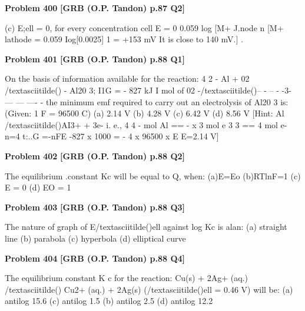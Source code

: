 \begin{problembox}
\textbf{Problem 400} \hfill \textbf{[GRB (O.P. Tandon) p.87 Q2]}
\label{q:ext-grb_all_questions-400}

(c) E;ell = 0, for every concentration cell 
E = 0 0.059 log [M+ J.node 
n 
[M+ lathode 
= \underline{\hspace{1cm}} 0.059 Iog[0.0025] 
1 
= +153 mV 
It is close to 140 mV.] .
\end{problembox}

\begin{problembox}
\textbf{Problem 401} \hfill \textbf{[GRB (O.P. Tandon) p.88 Q1]}
\label{q:ext-grb_all_questions-401}

On the basis of information available for the reaction: 
4 
2 
- Al + 02 /textasciitilde() 
- Al20 3; I1G = - 827 kJ I mol of 02 
-/textasciitilde()-- - --
- -3- ---
--- ---- -
the minimum emf required to carry out an electrolysis of 
Al20 3 is: 
(Given: 1 F = 96500 C) 
(a) 2.14 V 
(b) 4.28 V 
(c) 6.42 V 
(d) 8.56 V 
[Hint: 
Al /textasciitilde()AI3+ + 3e-
i. e., 
4 
4 
\underline{\hspace{1cm}} 
- mol Al == - x 3 mol e 
3 
3 
== 4 mol e-
n=4 
t:..G =-nFE 
-827 x 1000 = - 4 x 96500 x E 
E=2.14 V]
\end{problembox}

\begin{problembox}
\textbf{Problem 402} \hfill \textbf{[GRB (O.P. Tandon) p.88 Q2]}
\label{q:ext-grb_all_questions-402}

The equilibrium .constant Kc will be equal to Q, when: 
(a)E=Eo 
(b)RTlnF=1 
(c) E = 0 
(d) EO = 1
\end{problembox}

\begin{problembox}
\textbf{Problem 403} \hfill \textbf{[GRB (O.P. Tandon) p.88 Q3]}
\label{q:ext-grb_all_questions-403}

The nature of graph of E/textasciitilde()ell against log Kc is alan: 
(a) straight line 
(b) parabola 
(c) hyperbola 
(d) elliptical curve
\end{problembox}

\begin{problembox}
\textbf{Problem 404} \hfill \textbf{[GRB (O.P. Tandon) p.88 Q4]}
\label{q:ext-grb_all_questions-404}

The equilibrium constant K c for the reaction: 
Cu(s) + 2Ag+ (aq.) /textasciitilde() 
Cu2+ (aq.) + 2Ag(s) (/textasciitilde()ell = 0.46 V) 
will be: 
(a) antilog 15.6 
(c) antilog 1.5 
(b) antilog 2.5 
(d) antilog 12.2
\end{problembox}

